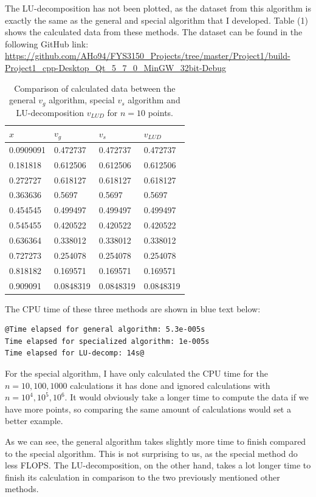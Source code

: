 \documentclass[12pt]{article}
\begin{document}
The LU-decomposition has not been plotted, as the dataset from this algorithm is exactly the same as the general and special algorithm that I developed. Table (1) shows the calculated data from these methods. The dataset can be found in the following GitHub link: \url{https://github.com/AHo94/FYS3150_Projects/tree/master/Project1/build-Project1_cpp-Desktop_Qt_5_7_0_MinGW_32bit-Debug} 

\begin{table}
\begin{center}
	\begin{tabular}{| l | l | l | l |}
		$x$ & $v_g$ & $v_s$ & $v_{LUD}$ \\ \hline
		0.0909091 & 0.472737 & 0.472737 & 0.472737 \\
		0.181818  & 0.612506 & 0.612506 & 0.612506 \\
		0.272727 &  0.618127 & 0.618127& 0.618127\\
		0.363636 &  0.5697 & 0.5697& 0.5697\\
		0.454545 &  0.499497 & 0.499497& 0.499497\\
		0.545455 &  0.420522 & 0.420522& 0.420522\\
		0.636364 &  0.338012 & 0.338012& 0.338012\\
		0.727273 &  0.254078 & 0.254078& 0.254078\\
		0.818182 &  0.169571 & 0.169571& 0.169571\\
		0.909091 &  0.0848319 & 0.0848319& 0.0848319 \\ \hline
	\end{tabular}
\caption{Comparison of calculated data between the general $v_g$ algorithm, special $v_s$ algorithm and LU-decomposition $v_{LUD}$ for $n=10$ points.}
\end{center}
\end{table}

The CPU time of these three methods are shown in blue text below:
\begin{lstlisting}
@Time elapsed for general algorithm: 5.3e-005s
Time elapsed for specialized algorithm: 1e-005s
Time elapsed for LU-decomp: 14s@
\end{lstlisting}
For the special algorithm, I have only calculated the CPU time for the $n=10,100,1000$ calculations it has done and ignored calculations with $n=10^4, 10^5, 10^6$. It would obviously take a longer time to compute the data if we have more points, so comparing the same amount of calculations would set a better example.

As we can see, the general algorithm takes slightly more time to finish compared to the special algorithm. This is not surprising to us, as the special method do less FLOPS. The LU-decomposition, on the other hand, takes a lot longer time to finish its calculation in comparison to the two previously mentioned other methods.
\end{document}

